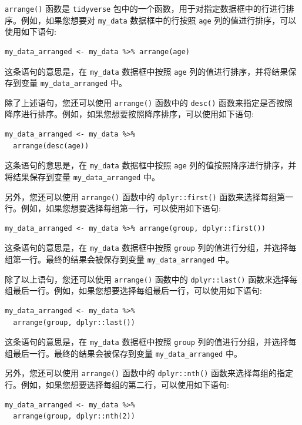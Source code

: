 \documentclass[
  letterpaper,
  DIV=11,
  numbers=noendperiod]{scrreprt}
\begin{document}
\texttt{arrange()} 函数是 \texttt{tidyverse}
包中的一个函数，用于对指定数据框中的行进行排序。例如，如果您想要对
\texttt{my\_data} 数据框中的行按照 \texttt{age}
列的值进行排序，可以使用如下语句:

\begin{verbatim}
my_data_arranged <- my_data %>% arrange(age)
\end{verbatim}

这条语句的意思是，在 \texttt{my\_data} 数据框中按照 \texttt{age}
列的值进行排序，并将结果保存到变量 \texttt{my\_data\_arranged} 中。

除了上述语句，您还可以使用 \texttt{arrange()} 函数中的 \texttt{desc()}
函数来指定是否按照降序进行排序。例如，如果您想要按照降序排序，可以使用如下语句:

\begin{verbatim}
my_data_arranged <- my_data %>% 
  arrange(desc(age))
\end{verbatim}

这条语句的意思是，在 \texttt{my\_data} 数据框中按照 \texttt{age}
列的值按照降序进行排序，并将结果保存到变量 \texttt{my\_data\_arranged}
中。

另外，您还可以使用 \texttt{arrange()} 函数中的 \texttt{dplyr::first()}
函数来选择每组第一行。例如，如果您想要选择每组第一行，可以使用如下语句:

\begin{verbatim}
my_data_arranged <- my_data %>% arrange(group, dplyr::first())
\end{verbatim}

这条语句的意思是，在 \texttt{my\_data} 数据框中按照 \texttt{group}
列的值进行分组，并选择每组第一行。最终的结果会被保存到变量
\texttt{my\_data\_arranged} 中。

除了以上语句，您还可以使用 \texttt{arrange()} 函数中的
\texttt{dplyr::last()}
函数来选择每组最后一行。例如，如果您想要选择每组最后一行，可以使用如下语句:

\begin{verbatim}
my_data_arranged <- my_data %>% 
  arrange(group, dplyr::last())
\end{verbatim}

这条语句的意思是，在 \texttt{my\_data} 数据框中按照 \texttt{group}
列的值进行分组，并选择每组最后一行。最终的结果会被保存到变量
\texttt{my\_data\_arranged} 中。

另外，您还可以使用 \texttt{arrange()} 函数中的 \texttt{dplyr::nth()}
函数来选择每组的指定行。例如，如果您想要选择每组的第二行，可以使用如下语句:

\begin{verbatim}
my_data_arranged <- my_data %>% 
  arrange(group, dplyr::nth(2))
\end{verbatim}
\end{document}
